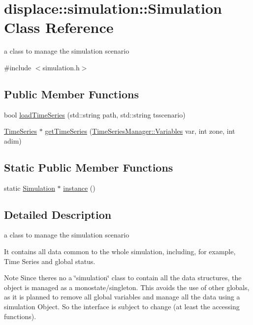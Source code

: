 \hypertarget{classdisplace_1_1simulation_1_1_simulation}{}\section{displace\+::simulation\+::Simulation Class Reference}
\label{classdisplace_1_1simulation_1_1_simulation}


a class to manage the simulation scenario  




{\ttfamily \#include $<$simulation.\+h$>$}

\subsection*{Public Member Functions}
\begin{DoxyCompactItemize}
\item 
bool \mbox{\hyperlink{classdisplace_1_1simulation_1_1_simulation_a83652bf1450883173248c63aa59e5759}{load\+Time\+Series}} (std\+::string path, std\+::string tsscenario)
\item 
\mbox{\hyperlink{classdisplace_1_1simulation_1_1_time_series}{Time\+Series}} $\ast$ \mbox{\hyperlink{classdisplace_1_1simulation_1_1_simulation_aaaacef90ad0ef7f69107931522f4bd65}{get\+Time\+Series}} (\mbox{\hyperlink{classdisplace_1_1simulation_1_1_time_series_manager_ae4e516e8c6ce2707d48ffafec4613ece}{Time\+Series\+Manager\+::\+Variables}} var, int zone, int adim)
\end{DoxyCompactItemize}
\subsection*{Static Public Member Functions}
\begin{DoxyCompactItemize}
\item 
static \mbox{\hyperlink{classdisplace_1_1simulation_1_1_simulation}{Simulation}} $\ast$ \mbox{\hyperlink{classdisplace_1_1simulation_1_1_simulation_a69665d23c8ade629695af8ab1b4a7e9a}{instance}} ()
\end{DoxyCompactItemize}


\subsection{Detailed Description}
a class to manage the simulation scenario 

It contains all data common to the whole simulation, including, for example, Time Series and global status. \begin{DoxyNote}{Note}
Since there\textquotesingle{}s no a \char`\"{}simulation\char`\"{} class to contain all the data structures, the object is managed as a monostate/singleton. This avoids the use of other globals, as it is planned to remove all global variables and manage all the data using a simulation Object. So the interface is subject to change (at least the accessing functions). 
\end{DoxyNote}


